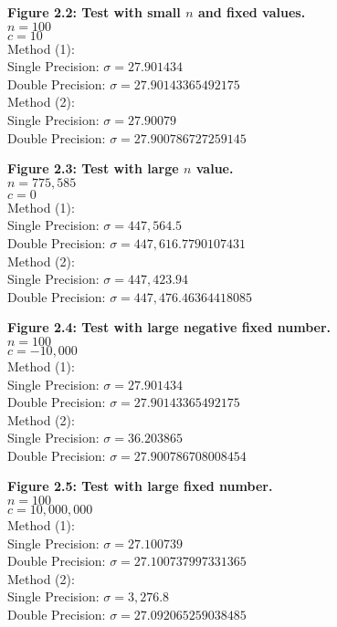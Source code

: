 \documentclass[12pt]{article}
\begin{document}
\begin{figure}[h]
	\textbf{Figure 2.2: Test with small $n$ and fixed values.}\\
	$n=100$\\
	$c=10$\\
	
	Method (1):\\
	Single Precision: $\sigma=27.901434$\\
	Double Precision: $\sigma=27.90143365492175$\\
	
	Method (2):\\
	Single Precision: $\sigma=27.90079$\\
	Double Precision: $\sigma=27.900786727259145$
\end{figure}

\begin{figure}[h]
	\textbf{Figure 2.3: Test with large $n$ value.}\\
	$n=775,585$\\
	$c=0$\\
	
	Method (1):\\
	Single Precision: $\sigma=447,564.5$\\
	Double Precision: $\sigma=447,616.7790107431$\\
	
	Method (2):\\
	Single Precision: $\sigma=447,423.94$\\
	Double Precision: $\sigma=447,476.46364418085$
\end{figure}

\begin{figure}[h]
	\textbf{Figure 2.4: Test with large negative fixed number.}\\
	$n=100$\\
	$c=-10,000$\\
	
	Method (1):\\
	Single Precision: $\sigma=27.901434$\\
	Double Precision: $\sigma=27.90143365492175$\\
	
	Method (2):\\
	Single Precision: $\sigma=36.203865$\\
	Double Precision: $\sigma=27.900786708008454$
\end{figure}

\begin{figure}[h]
	\textbf{Figure 2.5: Test with large fixed number.}\\
	$n=100$\\
	$c=10,000,000$\\
	
	Method (1):\\
	Single Precision: $\sigma=27.100739$\\
	Double Precision: $\sigma=27.100737997331365$\\
	
	Method (2):\\
	Single Precision: $\sigma=3,276.8$\\
	Double Precision: $\sigma=27.092065259038485$
\end{figure}
\end{document}
